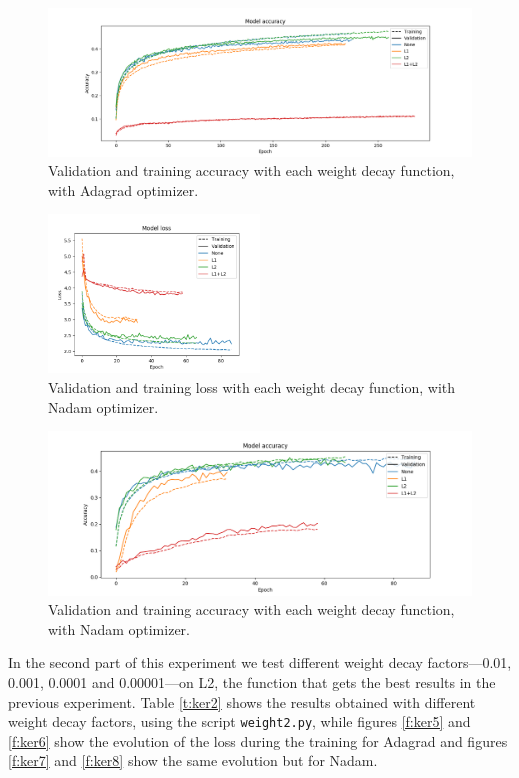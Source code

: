 \documentclass[]{article}
\begin{document}
\begin{figure}[H]
	\centering
	\includegraphics[width=\textwidth]{weight1_adagrad_acc}
	\caption{Validation and training accuracy with each weight decay function, with Adagrad optimizer.}
	\label{f:ker2}
\end{figure}

\begin{figure}[H]
	\centering
	\includegraphics[width=0.5\textwidth]{weight1_nadam_loss}
	\caption{Validation and training loss with each weight decay function, with Nadam optimizer.}
	\label{f:ker3}
\end{figure}

\begin{figure}[H]
	\centering
	\includegraphics[width=\textwidth]{weight1_nadam_acc}
	\caption{Validation and training accuracy with each weight decay function, with Nadam optimizer.}
	\label{f:ker4}
\end{figure}

In the second part of this experiment we test different weight decay factors---0.01, 0.001, 0.0001 and 0.00001---on L2, the function that gets the best results in the previous experiment. Table \ref{t:ker2} shows the results obtained with different weight decay factors, using the script \texttt{weight2.py}, while figures \ref{f:ker5} and \ref{f:ker6} show the evolution of the loss during the training for Adagrad and figures \ref{f:ker7} and \ref{f:ker8} show the same evolution but for Nadam.
\end{document}
